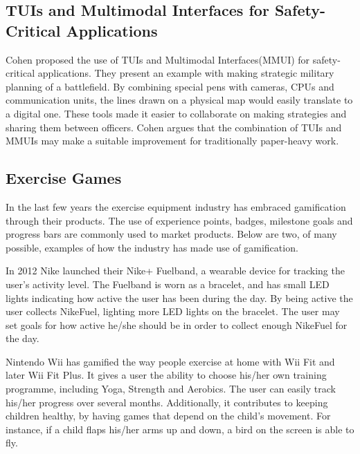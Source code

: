 \subsection{TUIs and Multimodal Interfaces for Safety-Critical Applications}
\label{sec:militaryuseoftui}
Cohen \etal{} proposed the use of TUIs and Multimodal Interfaces(MMUI) for safety-critical applications\cite{cohen2004tangible}. They present an example with making strategic military planning of a battlefield. By combining special pens with cameras, CPUs and communication units, the lines drawn on a physical map would easily translate to a digital one. These tools made it easier to collaborate on making strategies and sharing them between officers. Cohen \etal{} argues that the combination of TUIs and MMUIs may make a suitable improvement for traditionally paper-heavy work.

\subsection{Exercise Games}
\label{sec:exercisegames}
In the last few years the exercise equipment industry has embraced gamification through their products. The use of experience points, badges, milestone goals and progress bars are commonly used to market products. Below are two, of many possible, examples of how the industry has made use of gamification. 

In 2012 Nike launched their Nike+ Fuelband, a wearable device for tracking the user's activity level. The Fuelband is worn as a bracelet, and has small LED lights indicating how active the user has been during the day. By being active the user collects NikeFuel\texttrademark, lighting more LED lights on the bracelet. The user may set goals for how active he/she should be in order to collect enough NikeFuel for the day. 

Nintendo Wii has gamified the way people exercise at home with Wii Fit and later Wii Fit Plus. It gives a user the ability to choose his/her own training programme, including Yoga, Strength and Aerobics. The user can easily track his/her progress over several months. Additionally, it contributes to keeping children healthy, by having games that depend on the child's movement. For instance, if a child flaps his/her arms up and down, a bird on the screen is able to fly.
 